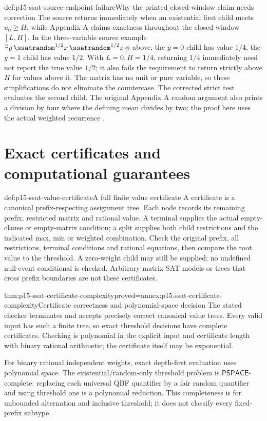 \begin{hbexample}{def:p15-ssat-source-endpoint-failure}{Why the printed closed-window claim needs correction}
The source returns immediately when an existential first child meets
\(u_0\geq H\), while Appendix A claims exactness throughout the
closed window \([L,H]\). In the three-variable source example
\(\exists y\,\ssatrandom^{1/2}x\,\ssatrandom^{1/2}z\;\phi\)
above, the \(y=0\) child has value \(1/4\), the \(y=1\) child
has value \(1/2\). With \(L=0,H=1/4\), returning \(1/4\)
immediately need not report the true value \(1/2\); it also fails
the requirement to return strictly above \(H\) for values above it.
The matrix has no unit or pure variable, so these simplifications do
not eliminate the countercase. The corrected strict test evaluates the
second child. The original Appendix A random argument also prints a
division by four where the defining mean divides by two; the proof here
uses the actual weighted recurrence
\cite[Fig.~2, p.~15; Appendix~A, pp.~48--49]{LittmanMajercikPitassi2000SSATAuthor}.
\end{hbexample}

\section{Exact certificates and computational guarantees}
\label{sec:p15-ssat-certificates}

\begin{hbmethod}{def:p15-ssat-value-certificate}{A full finite value certificate}
A certificate is a canonical prefix-respecting assignment tree.
Each node records its remaining prefix, restricted matrix and rational
value. A terminal supplies the actual empty-clause or empty-matrix
condition; a split supplies both child restrictions and the indicated
max, min or weighted combination. Check the original prefix, all
restrictions, terminal conditions and rational equations, then compare
the root value to the threshold. A zero-weight child may still be
supplied; no undefined null-event conditional is checked. Arbitrary
matrix-SAT models or trees that cross prefix boundaries are not these
certificates.
\end{hbmethod}

\begin{hbtheorem}{thm:p15-ssat-certificate-complexity}{proved=annex:p15.ssat-certificate-complexity}{Certificate correctness and polynomial-space decision}
The stated checker terminates and accepts precisely correct canonical
value trees. Every valid input has such a finite tree, so exact threshold
decisions have complete certificates. Checking is polynomial in the
explicit input and certificate length with binary rational arithmetic;
the certificate itself may be exponential.

For binary rational independent weights, exact depth-first evaluation
uses polynomial space. The existential/random-only threshold problem
is \(\mathsf{PSPACE}\)-complete: replacing each universal QBF
quantifier by a fair random quantifier and using threshold one is a
polynomial reduction. This completeness is for unbounded alternation
and inclusive threshold; it does not classify every fixed-prefix subtype.
\end{hbtheorem}

